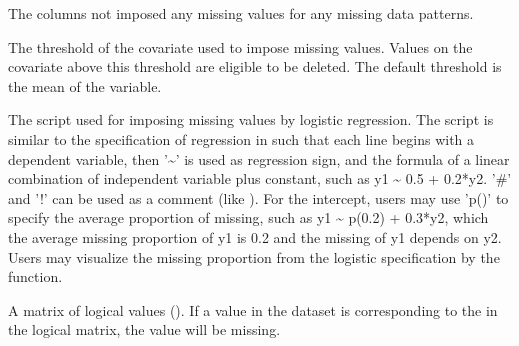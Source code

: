 \documentclass[a4paper]{book}
\begin{document}
\begin{Arguments}
\begin{ldescription}
\item[\code{ignoreCols}] 
The columns not imposed any missing values for any missing data patterns.

\item[\code{threshold}] 
The threshold of the covariate used to impose missing values. Values
on the covariate above this threshold are eligible to be
deleted. The default threshold is the mean of the variable.

\item[\code{logit}] 
The script used for imposing missing values by logistic regression. The script is similar to the specification of regression in  such that each line begins with a dependent variable, then '\textasciitilde{}' is used as regression sign, and the formula of a linear combination of independent variable plus constant, such as y1 \textasciitilde{} 0.5 + 0.2*y2. '\#' and '!' can be used as a comment (like ). For the intercept, users may use 'p()' to specify the average proportion of missing, such as y1 \textasciitilde{} p(0.2) + 0.3*y2, which the average missing proportion of y1 is 0.2 and the missing of y1 depends on y2. Users may visualize the missing proportion from the logistic specification by the  function.

\item[\code{logical}] 
A matrix of logical values (). If a value in the dataset is corresponding to the  in the logical matrix, the value will be missing.

\end{ldescription}
\end{Arguments}
%
\end{document}

